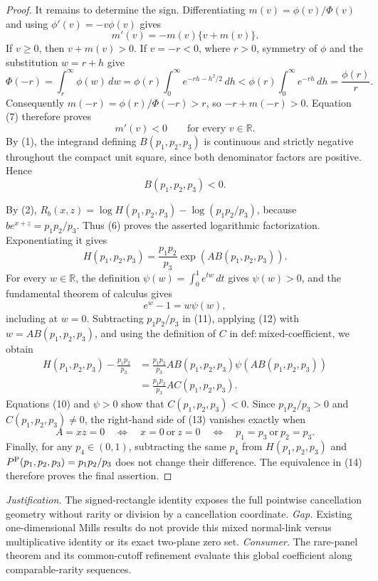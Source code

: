 \documentclass{article}
\begin{document}
\begin{proof}
It remains to determine the sign.  Differentiating \(m(v)=\phi(v)/\Phi(v)\) and using \(\phi'(v)=-v\phi(v)\) gives
\[
m'(v)=-m(v)\{v+m(v)\}.
\tag{7}
\]
If \(v\geq0\), then \(v+m(v)>0\).  If \(v=-r<0\), where \(r>0\), symmetry of \(\phi\) and the substitution \(w=r+h\) give
\[
\Phi(-r)
=\int_r^\infty\phi(w)\,dw
=\phi(r)\int_0^\infty e^{-rh-h^2/2}\,dh
<\phi(r)\int_0^\infty e^{-rh}\,dh
=\frac{\phi(r)}{r}.
\tag{8}
\]
Consequently \(m(-r)=\phi(r)/\Phi(-r)>r\), so \(-r+m(-r)>0\).  Equation (7) therefore proves
\[
m'(v)<0\qquad\text{for every }v\in\mathbb R.
\tag{9}
\]
By (1), the integrand defining \(B(p_1,p_2,p_3)\) is continuous and strictly negative throughout the compact unit square, since both denominator factors are positive.  Hence
\[
B(p_1,p_2,p_3)<0.
\tag{10}
\]

By (2), \(R_b(x,z)=\log H(p_1,p_2,p_3)-\log(p_1p_2/p_3)\), because \(be^{x+z}=p_1p_2/p_3\).  Thus (6) proves the asserted logarithmic factorization.  Exponentiating it gives
\[
H(p_1,p_2,p_3)
=\frac{p_1p_2}{p_3}\exp\!\left(A B(p_1,p_2,p_3)\right).
\tag{11}
\]
For every \(w\in\mathbb R\), the definition \(\psi(w)=\int_0^1e^{tw}\,dt\) gives \(\psi(w)>0\), and the fundamental theorem of calculus gives
\[
e^w-1=w\psi(w),
\tag{12}
\]
including at \(w=0\).  Subtracting \(p_1p_2/p_3\) in (11), applying (12) with \(w=A B(p_1,p_2,p_3)\), and using the definition of \(C\) in \(\mathrm{def{:}mixed\text{-}coefficient}\), we obtain
\[
\begin{aligned}
H(p_1,p_2,p_3)-\frac{p_1p_2}{p_3}
&=\frac{p_1p_2}{p_3}A B(p_1,p_2,p_3)
\psi\!\left(A B(p_1,p_2,p_3)\right)\\
&=\frac{p_1p_2}{p_3}A C(p_1,p_2,p_3).
\end{aligned}
\tag{13}
\]
Equations (10) and \(\psi>0\) show that \(C(p_1,p_2,p_3)<0\).  Since \(p_1p_2/p_3>0\) and \(C(p_1,p_2,p_3)\neq0\), the right-hand side of (13) vanishes exactly when
\[
A=xz=0
\quad\Longleftrightarrow\quad
x=0\ \text{or}\ z=0
\quad\Longleftrightarrow\quad
p_1=p_3\ \text{or}\ p_2=p_3.
\tag{14}
\]
Finally, for any \(p_4\in(0,1)\), subtracting the same \(p_4\) from \(H(p_1,p_2,p_3)\) and \(P^{\rm P}(p_1,p_2,p_3)=p_1p_2/p_3\) does not change their difference.  The equivalence in (14) therefore proves the final assertion.
\end{proof}
\par\smallskip\noindent \textit{Justification.} The signed-rectangle identity exposes the full pointwise cancellation geometry without rarity or division by a cancellation coordinate. \textit{Gap.} Existing one-dimensional Mills results do not provide this mixed normal-link versus multiplicative identity or its exact two-plane zero set. \textit{Consumer.} The rare-panel theorem and its common-cutoff refinement evaluate this global coefficient along comparable-rarity sequences.
\end{document}
